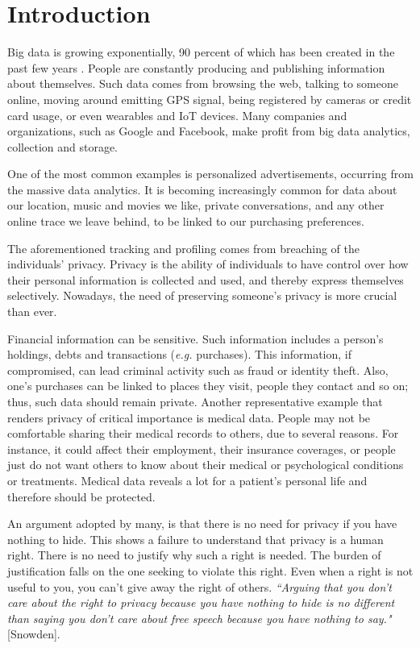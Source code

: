 \chapter{Introduction}\label{c:introduction}


Big data is growing exponentially, 90 percent of which has been created in the past few years \cite{kim2014big}.
People are constantly producing and publishing information about themselves.
Such data comes from browsing the web, talking to someone online, moving around emitting GPS signal, being registered by cameras or credit card usage, or even wearables and IoT devices.
Many companies and organizations, such as Google and Facebook, make profit from big data analytics, collection and storage.

One of the most common examples is personalized advertisements, occurring from the massive data analytics.
It is becoming increasingly common for data about our location, music and movies we like, private conversations, and any other online trace we leave behind, to be linked to our purchasing preferences.

The aforementioned tracking and profiling comes from breaching of the individuals’ privacy.
Privacy is the ability of individuals to have control over how their personal information is collected and used, and thereby express themselves selectively.
Nowadays, the need of preserving someone's privacy is more crucial than ever.

Financial information can be sensitive.
Such information includes a person’s holdings, debts and transactions (\textit{e.g.} purchases).
This information, if compromised, can lead criminal activity such as fraud or identity theft.
Also, one’s purchases can be linked to places they visit, people they contact and so on; thus, such data should remain private. Another representative example that renders privacy of critical importance is medical data.
People may not be comfortable sharing their medical records to others, due to several reasons.
For instance, it could affect their employment, their insurance coverages, or people just do not want others to know about their medical or psychological conditions or treatments.
Medical data reveals a lot for a patient’s personal life and therefore should be protected.

An argument adopted by many, is that there is no need for privacy if you have nothing to hide.
This shows a failure to understand that privacy is a human right.
There is no need to justify why such a right is needed.
The burden of justification falls on the one seeking to violate this right.
Even when a right is not useful to you, you can't give away the right of others.
\textit{``Arguing that you don't care about the right to privacy because you have nothing to hide is no different than saying you don't care about free speech because you have nothing to say."} [Snowden].

